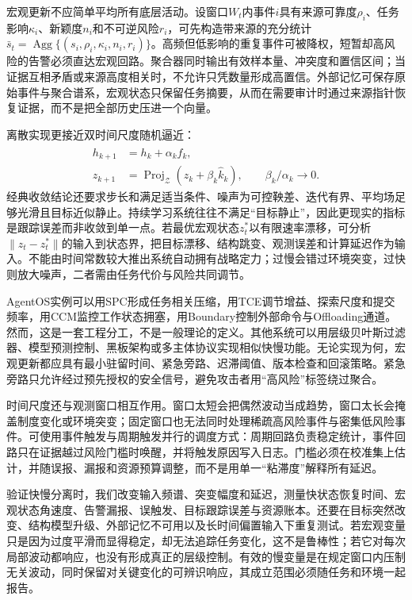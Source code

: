 宏观更新不应简单平均所有底层活动。设窗口$W_t$内事件$i$具有来源可靠度$\rho_i$、任务影响$\kappa_i$、新颖度$n_i$和不可逆风险$r_i$，可先构造带来源的充分统计$\bar s_t=\operatorname{Agg}\{(s_i,\rho_i,\kappa_i,n_i,r_i)\}$。高频但低影响的重复事件可被降权，短暂却高风险的告警必须直达宏观回路。聚合器同时输出有效样本量、冲突度和置信区间；当证据互相矛盾或来源高度相关时，不允许只凭数量形成高置信。外部记忆可保存原始事件与聚合谱系，宏观状态只保留任务摘要，从而在需要审计时通过来源指针恢复证据，而不是把全部历史压进一个向量。

离散实现更接近双时间尺度随机逼近：
\begin{align}
 h_{k+1}&=h_k+\alpha_k\widehat f_k,\\
 z_{k+1}&=\operatorname{Proj}_{\mathcal Z}\!\left(z_k+\beta_k\widehat k_k\right),
 \qquad \beta_k/\alpha_k\rightarrow0.
\end{align}
经典收敛结论还要求步长和满足适当条件、噪声为可控鞅差、迭代有界、平均场足够光滑且目标近似静止。持续学习系统往往不满足“目标静止”，因此更现实的指标是跟踪误差而非收敛到单一点。若最优宏观状态$z_t^*$以有限速率漂移，可分析$\|z_t-z_t^*\|$的输入到状态界，把目标漂移、结构跳变、观测误差和计算延迟作为输入。不能由时间常数较大推出系统自动拥有战略定力；过慢会错过环境突变，过快则放大噪声，二者需由任务代价与风险共同调节。

AgentOS实例可以用SPC形成任务相关压缩，用TCE调节增益、探索尺度和提交频率，用CCM监控工作状态拥塞，用Boundary控制外部命令与Offloading通道。然而，这是一套工程分工，不是一般理论的定义。其他系统可以用层级贝叶斯过滤器、模型预测控制、黑板架构或多主体协议实现相似快慢功能。无论实现为何，宏观更新都应具有最小驻留时间、紧急旁路、迟滞阈值、版本检查和回滚策略。紧急旁路只允许经过预先授权的安全信号，避免攻击者用“高风险”标签绕过聚合。

时间尺度还与观测窗口相互作用。窗口太短会把偶然波动当成趋势，窗口太长会掩盖制度变化或环境突变；固定窗口也无法同时处理稀疏高风险事件与密集低风险事件。可使用事件触发与周期触发并行的调度方式：周期回路负责稳定统计，事件回路只在证据越过风险门槛时唤醒，并将触发原因写入日志。门槛必须在校准集上估计，并随误报、漏报和资源预算调整，而不是用单一“粘滞度”解释所有延迟。

验证快慢分离时，我们改变输入频谱、突变幅度和延迟，测量快状态恢复时间、宏观状态角速度、告警漏报、误触发、目标跟踪误差与资源账本。还要在目标突然改变、结构模型升级、外部记忆不可用以及长时间偏置输入下重复测试。若宏观变量只是因为过度平滑而显得稳定，却无法追踪任务变化，这不是鲁棒性；若它对每次局部波动都响应，也没有形成真正的层级控制。有效的慢变量是在规定窗口内压制无关波动，同时保留对关键变化的可辨识响应，其成立范围必须随任务和环境一起报告。

